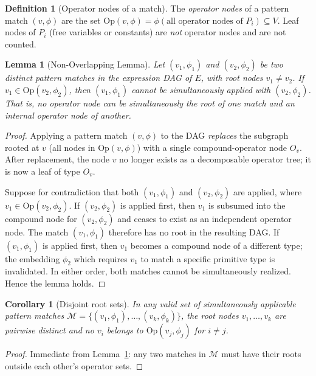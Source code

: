 \documentclass[12pt,a4paper]{article}
\newtheorem{lemma}[theorem]{Lemma}
\newtheorem{corollary}[theorem]{Corollary}
\theoremstyle{definition}
\newtheorem{definition}[theorem]{Definition}
\begin{document}
\begin{definition}[Operator nodes of a match]
\label{def:opnodes}
The \emph{operator nodes} of a pattern match $(v, \phi)$ are the set
$\mathrm{Op}(v, \phi) = \phi(\text{all operator nodes of } P_i) \subseteq V$.
Leaf nodes of $P_i$ (free variables or constants) are \emph{not} operator
nodes and are not counted.
\end{definition}

\begin{lemma}[Non-Overlapping Lemma]
\label{lem:nooverlap}
Let $(v_1, \phi_1)$ and $(v_2, \phi_2)$ be two distinct pattern matches
in the expression DAG of $E$, with root nodes $v_1 \neq v_2$.
If $v_1 \in \mathrm{Op}(v_2, \phi_2)$, then $(v_1, \phi_1)$ cannot be
simultaneously applied with $(v_2, \phi_2)$.
That is, no operator node can be simultaneously the root of one match
\emph{and} an internal operator node of another.
\end{lemma}

\begin{proof}
Applying a pattern match $(v, \phi)$ to the DAG \emph{replaces} the
subgraph rooted at $v$ (all nodes in $\mathrm{Op}(v, \phi)$) with a
single compound-operator node $O_v$.
After replacement, the node $v$ no longer exists as a decomposable
operator tree; it is now a leaf of type $O_v$.

Suppose for contradiction that both $(v_1, \phi_1)$ and $(v_2, \phi_2)$
are applied, where $v_1 \in \mathrm{Op}(v_2, \phi_2)$.
If $(v_2, \phi_2)$ is applied first, then $v_1$ is subsumed into the
compound node for $(v_2, \phi_2)$ and ceases to exist as an independent
operator node.  The match $(v_1, \phi_1)$ therefore has no root in the
resulting DAG.
If $(v_1, \phi_1)$ is applied first, then $v_1$ becomes a compound
node of a different type; the embedding $\phi_2$ which requires $v_1$
to match a specific primitive type is invalidated.
In either order, both matches cannot be simultaneously realized.
Hence the lemma holds.
\end{proof}

\begin{corollary}[Disjoint root sets]
\label{cor:disjoint}
In any valid set of simultaneously applicable pattern matches
$\mathcal{M} = \{(v_1, \phi_1), \ldots, (v_k, \phi_k)\}$, the root
nodes $v_1, \ldots, v_k$ are pairwise distinct and no $v_i$ belongs to
$\mathrm{Op}(v_j, \phi_j)$ for $i \neq j$.
\end{corollary}

\begin{proof}
Immediate from Lemma~\ref{lem:nooverlap}: any two matches in
$\mathcal{M}$ must have their roots outside each other's operator sets.
\end{proof}
\end{document}
